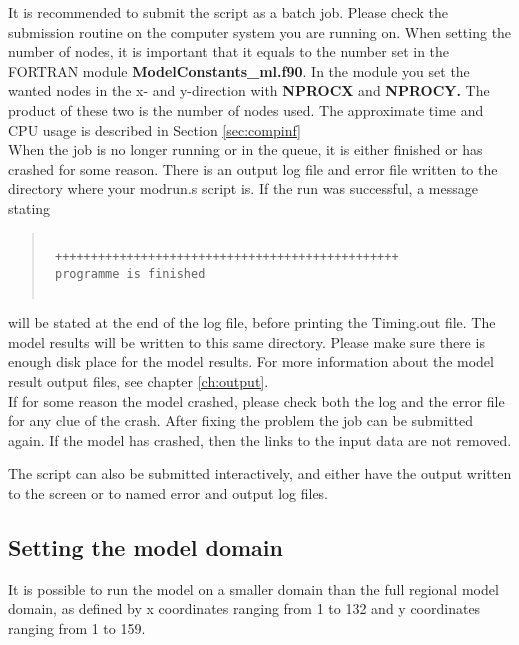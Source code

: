 It is recommended to submit the script as a batch job. Please check the submission routine 
on the computer system you are running on. 
When setting the number of nodes, it is important that it equals to the number set in the FORTRAN module 
{\bf ModelConstants\_ml.f90}. In the module you set the wanted nodes in the x- and y-direction with {\bf NPROCX } and 
{\bf NPROCY.} The product of these two is the number of nodes used. 
The approximate time and CPU usage is described in Section \ref{sec:compinf}\\

When the job is no longer running or in the queue, it is either finished or has crashed for some reason. 
There is an output log file and error file written to the directory where your modrun.s script is. 
If the run was successful, a message stating 
\begin{quote}
\begin{verbatim}

 ++++++++++++++++++++++++++++++++++++++++++++++++
 programme is finished


\end{verbatim}
\end{quote}
will be stated at the end of the log file, before printing the Timing.out file.   
The model results will be written to this same directory. Please make 
sure there is enough disk place for the model results. 
For more information about the model result output files, see chapter \ref{ch:output}.\\

If for some reason the model crashed, please check both the log and the error file for any 
clue of the crash. After fixing the problem the job can be submitted again. If the 
model has crashed, then the links to the input data are not removed. 

The script can also be submitted interactively, and either have the output written to the screen or to 
named error and output log files. 
 
\newpage

\subsection{Setting the model domain}

It is possible to run the model on a smaller domain than the full
regional model domain, as defined by  x coordinates ranging
from 1 to 132 and y coordinates ranging from 1 to 159. 

